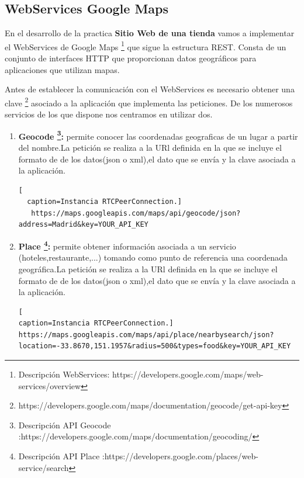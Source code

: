 \subsection{WebServices Google Maps}
En el desarrollo de la practica \textbf{Sitio Web de una tienda} vamos a implementar el WebServices de Google Maps \footnote{Descripción WebServices: https://developers.google.com/maps/web-services/overview} que sigue la estructura REST. Consta de un conjunto de interfaces HTTP que proporcionan datos geográficos para aplicaciones que utilizan mapas.

Antes de establecer la comunicación con el WebServices es necesario obtener una clave \footnote{https://developers.google.com/maps/documentation/geocode/get-api-key} asociado a la aplicación que implementa las peticiones.
De los numerosos servicios de los que dispone nos centramos en utilizar dos.
\begin{enumerate}
\item \textbf{Geocode \footnote{Descripción API Geocode :https://developers.google.com/maps/documentation/geocoding/}:} permite conocer las coordenadas geograficas de un lugar a partir del nombre.La petición se realiza a la URl definida  en la que se incluye el formato de de los datos(json o xml),el dato que se envía y la clave asociada a la aplicación.
  \begin{lstlisting}[
  caption=Instancia RTCPeerConnection.]
   https://maps.googleapis.com/maps/api/geocode/json?address=Madrid&key=YOUR_API_KEY
  \end{lstlisting}
 \item \textbf{Place \footnote{Descripción API Place :https://developers.google.com/places/web-service/search}:} permite obtener información asociada a un servicio (hoteles,restaurante,...) tomando como punto de referencia una coordenada geográfica.La petición se realiza a la URl definida en la que se incluye el formato de de los datos(json o xml),el dato que se envía y la clave asociada a la aplicación.
\begin{lstlisting}[
caption=Instancia RTCPeerConnection.]
https://maps.googleapis.com/maps/api/place/nearbysearch/json?location=-33.8670,151.1957&radius=500&types=food&key=YOUR_API_KEY
\end{lstlisting}
\end{enumerate} 

